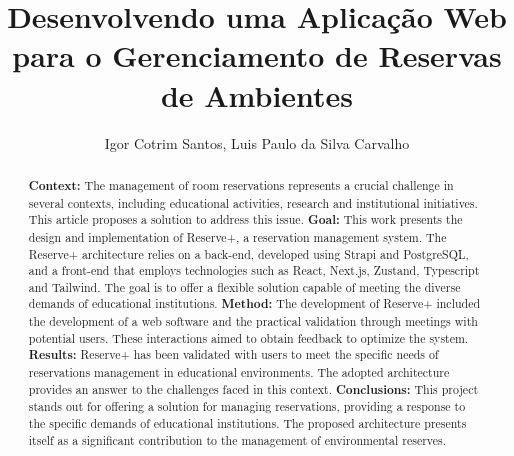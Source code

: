 \documentclass[12pt]{article}
\title{Desenvolvendo uma Aplicação Web para o Gerenciamento de Reservas de Ambientes}
\author{Igor Cotrim Santos\inst{1}, Luis Paulo da Silva Carvalho\inst{1}}
\begin{document}
 

\maketitle

\begin{abstract}
\textbf{Context:} The management of room reservations represents a crucial challenge in several contexts, including educational activities, research and institutional initiatives. This article proposes a solution to address this issue. \textbf{Goal:} This work presents the design and implementation of Reserve+, a reservation management system. The Reserve+ architecture relies on a back-end, developed using Strapi and PostgreSQL, and a front-end that employs technologies such as React, Next.js, Zustand, Typescript and Tailwind. The goal is to offer a flexible solution capable of meeting the diverse demands of educational institutions. \textbf{Method:} The development of Reserve+ included the development of a web software and the practical validation through meetings with potential users. These interactions aimed to obtain feedback to optimize the system. \textbf{Results:} Reserve+ has been validated with users to meet the specific needs of reservations management in educational environments. The adopted architecture provides an answer to the challenges faced in this context. \textbf{Conclusions:} This project stands out for offering a solution for managing reservations, providing a response to the specific demands of educational institutions. The proposed architecture presents itself as a significant contribution to the management of environmental reserves.
\end{abstract}
     
\end{document}
